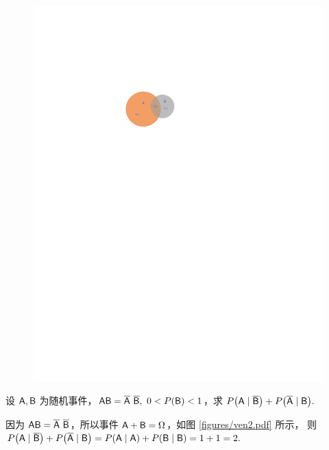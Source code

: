 \begin{minipage}[b]{0.3\linewidth}
    \begin{figure}[H]
        \centering
        \includegraphics[scale=0.8]{figures/ven3.pdf}
        \caption{}
        \label{figures/ven3.pdf}
    \end{figure}
\end{minipage}

\begin{example}
    设 $\mathsf{A},\mathsf{B}$ 为随机事件，$\mathsf{AB}=\overline{\mathsf{A}}~\overline{\mathsf{B}},~0<P(\mathsf{B})<1$，求 $P\qty(\mathsf{A}\mid\overline{\mathsf{B}})+P\qty(\overline{\mathsf{A}}\mid\mathsf{B}).$
\end{example}
\begin{solution}
    因为 $\mathsf{AB}=\overline{\mathsf{A}}~\overline{\mathsf{B}}$，所以事件 $\mathsf{A}+\mathsf{B}=\Omega$，如图 \ref{figures/ven2.pdf} 所示，
    则 $P\qty(\mathsf{A}\mid\overline{\mathsf{B}})+P\qty(\overline{\mathsf{A}}\mid\mathsf{B})=P(\mathsf{A}\mid\mathsf{A})+P(\mathsf{B}\mid\mathsf{B})=1+1=2.$
\end{solution}

